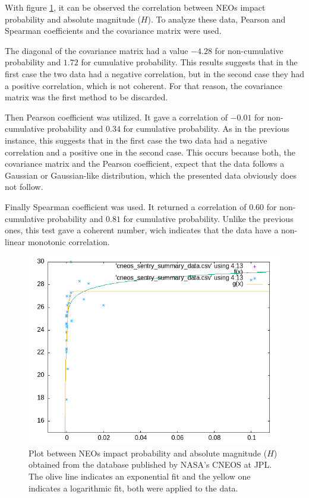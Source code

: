 \documentclass[
	a4paper, %
	10pt, %
	unnumberedsections, %
	twoside, %
]{LTJournalArticle}
\begin{document}
With figure \ref{fig:probability}, it can be observed the correlation between NEOs impact probability
and absolute magnitude ($H$). To analyze these data, Pearson and Spearman coefficients and the
covariance matrix were used. 

The diagonal of the covariance matrix had a value $-4.28$ for non-cumulative probability and $1.72$
for cumulative probability. This results suggests that in the first case the two data had a negative
correlation, but in the second case they had a positive correlation, which is not coherent. For that
reason, the covariance matrix was the first method to be discarded.

Then Pearson coefficient was utilized. It gave a correlation of $-0.01$ for non-cumulative
probability and $0.34$ for cumulative probability. As in the previous instance, this suggests that
in the first case the two data had a negative correlation and a positive one in the second case. This
occurs because both, the covariance matrix and the Pearson coefficient, expect that the data follows
a Gaussian or Gaussian-like distribution, which the presented data obviously does not follow.

Finally Spearman coefficient was used. It returned a correlation of $0.60$ for non-cumulative
probability and $0.81$ for cumulative probability. Unlike the previous ones, this test gave a
coherent number, wich indicates that the data have a non-linear monotonic correlation.

\begin{figure}[H] %
	\includegraphics[width=\linewidth]{correlation.png}
	\caption{Plot between NEOs impact probability and absolute magnitude ($H$) obtained from the database published by NASA’s CNEOS at JPL. The olive line indicates an exponential fit and the yellow one indicates a logarithmic fit, both were applied to the data.}
	\label{fig:probability}
\end{figure}
\end{document}
